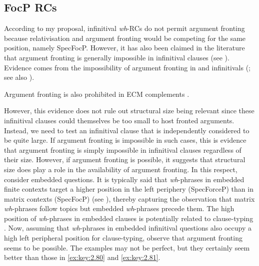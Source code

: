 \documentclass[output=paper]{langsci/langscibook}
\begin{document}
\subsection{FocP RCs}

According to my proposal, infinitival
\emph{wh}{-\glspl{RC} do not permit argument fronting because relativisation
and argument fronting} would be competing for the same position, namely
SpecFocP\@. However, it has also been claimed in the literature that argument
fronting is generally impossible in infinitival clauses (see
\citealt[206--208]{Bianchi1999}). Evidence comes from the impossibility of
argument fronting in  and  infinitivals
(\citealt[67--68]{Haegeman2012}; see also
\citealt[484--485]{HooperThompson1973}).

\ea\label{ex:key:2.80} \textcite[485]{HooperThompson1973}
    \z
\z
Argument fronting is also prohibited in \gls{ECM} complements \parencite[Ch.\ 2, note 20]{Haegeman2012}.

\ea\label{ex:key:2.81} \textcite[297, fn.\ 14]{CulicoverLevine2001}
    \z
\z
However, this evidence does not rule out structural size being relevant since
these infinitival clauses could themselves be too small to host fronted
arguments. Instead, we need to test an infinitival clause that is independently
considered to be quite large. If argument fronting is impossible in such cases,
this is evidence that argument fronting is simply impossible in infinitival
clauses regardless of their size. However, if argument fronting is possible, it
suggests that structural size does play a role in the availability of argument
fronting. In this respect, consider embedded questions. It is typically said
that \emph{wh}{-phrases in embedded} finite contexts target a higher
position in the left periphery (SpecForceP) than in matrix contexts (SpecFocP)
(see \citealt{Haegeman2012,Pesetsky1995}), thereby capturing the observation
that matrix \emph{wh}{-phrases follow topics but embedded} \emph{wh}{-phrases
precede them. The high position of} \emph{wh}{-phrases in embedded clauses is}
potentially related to clause-typing \citep{Cheng1991}. Now, assuming that
\emph{wh}-phrases in embedded infinitival questions also occupy a high left
peripheral position for clause-typing, observe that argument fronting seems to
be possible. The examples may not be perfect, but they certainly seem better
than those in \eqref{ex:key:2.80} and \eqref{ex:key:2.81}.
\end{document}
